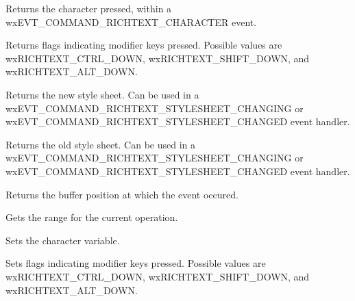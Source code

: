 Returns the character pressed, within a wxEVT\_COMMAND\_RICHTEXT\_CHARACTER event.

\label{wxrichtexteventgetflags}


Returns flags indicating modifier keys pressed. Possible values are wxRICHTEXT\_CTRL\_DOWN,
wxRICHTEXT\_SHIFT\_DOWN, and wxRICHTEXT\_ALT\_DOWN.

\label{wxrichtexteventgetnewstylesheet}


Returns the new style sheet. Can be used in a wxEVT\_COMMAND\_RICHTEXT\_STYLESHEET\_CHANGING or
wxEVT\_COMMAND\_RICHTEXT\_STYLESHEET\_CHANGED event handler.

\label{wxrichtexteventgetoldstylesheet}


Returns the old style sheet. Can be used in a wxEVT\_COMMAND\_RICHTEXT\_STYLESHEET\_CHANGING or
wxEVT\_COMMAND\_RICHTEXT\_STYLESHEET\_CHANGED event handler.

\label{wxrichtexteventgetposition}


Returns the buffer position at which the event occured.

\label{wxrichtexteventgetrange}


Gets the range for the current operation.

\label{wxrichtexteventsetcharacter}


Sets the character variable.

\label{wxrichtexteventsetflags}


Sets flags indicating modifier keys pressed. Possible values are wxRICHTEXT\_CTRL\_DOWN,
wxRICHTEXT\_SHIFT\_DOWN, and wxRICHTEXT\_ALT\_DOWN.

\label{wxrichtexteventsetnewstylesheet}

